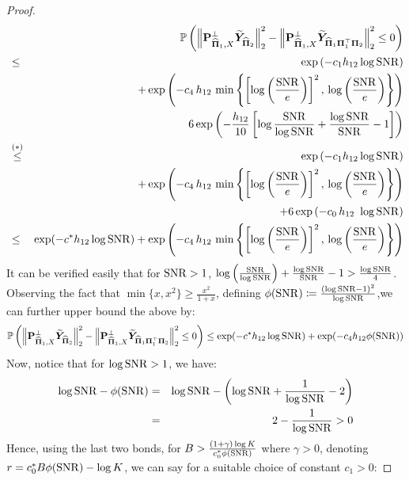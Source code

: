 \documentclass[numsec,webpdf,modern,medium,namedate]{oup-authoring-template}
\theoremstyle{thmstyleone}%
\theoremstyle{thmstyletwo}%
\theoremstyle{thmstylethree}%
\begin{document}
\begin{proof}
{\footnotesize
\begin{eqnarray*}
    &&\mathbb{P}\left(\left\| \mathbf{P}_{\widehat{\boldsymbol{\Pi}}_1, X}^\perp \widetilde{\boldsymbol{Y}}_{{\widehat{\boldsymbol{\Pi}}_2}}\right\|_2^2 
- \left\| \mathbf{P}_{\widehat{\boldsymbol{\Pi}}_1, X}^\perp \widetilde{\boldsymbol{Y}}_{\widehat{\boldsymbol{\Pi}}_1 \boldsymbol{\Pi}_1^\top \boldsymbol{\Pi}_2} \right\|_2^2 \leq 0\right) \\
& \leq & \exp\left(-c_1h_{12}\log \mathrm{SNR}\right)\\
        && +  \exp \left( - c_{4} \, h_{12} \, \min \left\{\left[\log\left(\dfrac{\mathrm{SNR}}{e}\right)\right]^2, \, \log\left(\dfrac{\mathrm{SNR}}{e}\right) \right\}\right)\\
        && 6 \exp\left(-\frac{h_{12}}{10}\left[\log \frac{\mathrm{SNR}}{\log \mathrm{SNR}} + \dfrac{\log \mathrm{SNR}}{\mathrm{SNR}} -1\right]\right)\\
& \overset{(\ast)}{\leq} &   \exp\left(-c_1h_{12}\log \mathrm{SNR}\right) \\
&& +  \exp \left( - c_{4} \, h_{12} \, \min \left\{\left[\log\left(\dfrac{\mathrm{SNR}}{e}\right)\right]^2, \, \log\left(\dfrac{\mathrm{SNR}}{e}\right) \right\}\right) \\
        &&+ 6 \exp \left( - c_0 \,  h_{12}\ \log \mathrm{SNR} \right)\\
         & \leq & \exp(-c^\ast h_{12} \log \mathrm{SNR})  + \exp \left( - c_{4} \, h_{12} \, \min \left\{\left[\log\left(\dfrac{\mathrm{SNR}}{e}\right)\right]^2, \, \log\left(\dfrac{\mathrm{SNR}}{e}\right) \right\}\right)
\end{eqnarray*}}
It can be verified easily that for $\mathrm{SNR} > 1$, $\log\left(\frac{\mathrm{SNR}}{\log \mathrm{SNR}}\right)+\frac{\log \mathrm{SNR}}{\mathrm{SNR}} - 1 > \frac{\log \mathrm{SNR}}{4}$. Observing the fact that $\min\{x,x^2\} \geq \frac{x^2}{1+x}$, defining $\phi(\mathrm{SNR})\coloneq \frac{(\log\mathrm{SNR}-1)^2}{\log \mathrm{SNR}}$,we can further upper bound the above by:
{\small
\begin{eqnarray*}
    \mathbb{P}\left(\left\| \mathbf{P}_{\widehat{\boldsymbol{\Pi}}_1, X}^\perp \widetilde{\boldsymbol{Y}}_{{\widehat{\boldsymbol{\Pi}}_2}}\right\|_2^2 
- \left\| \mathbf{P}_{\widehat{\boldsymbol{\Pi}}_1, X}^\perp \widetilde{\boldsymbol{Y}}_{\widehat{\boldsymbol{\Pi}}_1 \boldsymbol{\Pi}_1^\top \boldsymbol{\Pi}_2} \right\|_2^2 \leq 0\right) \leq \exp(-c^\ast h_{12} \log \mathrm{SNR}) + \exp(-c_4 h_{12} \phi(\mathrm{SNR}))
\end{eqnarray*}}
Now, notice that for $\log \mathrm{SNR} > 1$, we have:
\begin{eqnarray*}
    \log \mathrm{SNR} - \phi(\mathrm{SNR}) & = & \log\mathrm{SNR} - \left(\log \mathrm{SNR} + \frac{1}{\log \mathrm{SNR}}-2\right)\\
    & = & 2 - \frac{1}{\log \mathrm{SNR}} > 0
\end{eqnarray*}
Hence, using the last two bonds, for $B > \frac{(1+\gamma)\log K}{c_0^\ast\phi(\mathrm{SNR})}$ where $\gamma > 0$, denoting $r = c_0^\ast B \phi(\mathrm{SNR}) - \log K$, we can say for a suitable choice of constant $c_1>0$:

\end{proof}
\end{document}
